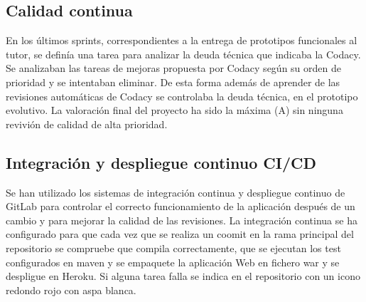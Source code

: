 \subsection{Calidad continua}
En los últimos sprints, correspondientes a la entrega de prototipos funcionales al tutor,
se definía una tarea para analizar la deuda técnica que indicaba la Codacy.
Se analizaban las tareas de mejoras propuesta por Codacy según su orden de prioridad y se intentaban eliminar.
De esta forma además de aprender de las revisiones automáticas de Codacy se controlaba la deuda técnica, en el prototipo evolutivo.
La valoración final del proyecto ha sido la máxima (A) sin ninguna revivión de calidad de alta prioridad.

\subsection{Integración y despliegue continuo CI/CD}
Se han utilizado los sistemas de integración continua y despliegue continuo de GitLab para controlar el correcto funcionamiento de la aplicación después de un cambio y para mejorar la calidad de las revisiones.
La integración continua se ha configurado para que cada vez que se realiza un coomit en la rama principal del repositorio se compruebe que compila correctamente, que se ejecutan los test configurados en maven y se empaquete la aplicación Web en fichero war y se despligue en Heroku. Si alguna tarea falla se indica en el repositorio con un icono redondo rojo con aspa blanca.
